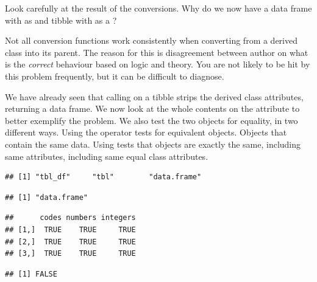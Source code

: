 \documentclass[krantz2]{krantz}\usepackage{knitr}%
\begin{document}
\begin{playground}
Look carefully at the result of the conversions. Why do we now have a data frame with  as  and tibble with  as a ?
\end{playground}

\begin{explainbox}
Not all conversion functions work consistently when converting from a derived class into its parent. The reason for this is disagreement between author on what is the \emph{correct} behaviour based on logic and theory. You are not likely to be hit by this problem frequently, but it can be difficult to diagnose.

We have already seen that calling  on a tibble strips the derived class attributes, returning a data frame. We now look at the whole contents on the  attribute to better exemplify the problem. We also test the two objects for equality, in two different ways. Using the operator \code{==} tests for equivalent objects. Objects that contain the same data. Using  tests that objects are exactly the same, including same attributes, including same equal class attributes.

\begin{knitrout}\footnotesize
{}\color{fgcolor}\begin{kframe}
\begin{alltt}
\end{alltt}
\begin{verbatim}
## [1] "tbl_df"     "tbl"        "data.frame"
\end{verbatim}
\begin{alltt}
\end{alltt}
\begin{verbatim}
## [1] "data.frame"
\end{verbatim}
\begin{alltt}
 \hlopt{==} 
\end{alltt}
\begin{verbatim}
##      codes numbers integers
## [1,]  TRUE    TRUE     TRUE
## [2,]  TRUE    TRUE     TRUE
## [3,]  TRUE    TRUE     TRUE
\end{verbatim}
\begin{alltt}
\end{alltt}
\begin{verbatim}
## [1] FALSE
\end{verbatim}
\end{kframe}
\end{knitrout}


\end{explainbox}
\end{document}
